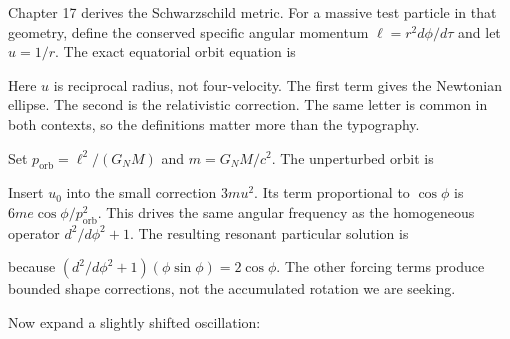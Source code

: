 \documentclass[
  11pt,
  letterpaper,
  oneside,
  openany]{scrbook}
\begin{document}
Chapter 17 derives the Schwarzschild metric. For a massive test particle
in that geometry, define the conserved specific angular momentum
\(\ell=r^2d\phi/d\tau\) and let \(u=1/r\). The exact equatorial orbit
equation is

\begin{center}
\begingroup
{}
\ifdim\wd\grmathbox>\linewidth
\resizebox{\linewidth}{!}{\usebox{\grmathbox}}
\else\usebox{\grmathbox}\fi
\endgroup
\end{center}

Here \(u\) is reciprocal radius, not four-velocity. The first term gives
the Newtonian ellipse. The second is the relativistic correction. The
same letter is common in both contexts, so the definitions matter more
than the typography.

Set \(p_{\mathrm{orb}}=\ell^2/(G_NM)\) and \(m=G_NM/c^2\). The
unperturbed orbit is

\begin{center}
\begingroup
{}
\ifdim\wd\grmathbox>\linewidth
\resizebox{\linewidth}{!}{\usebox{\grmathbox}}
\else\usebox{\grmathbox}\fi
\endgroup
\end{center}

Insert \(u_0\) into the small correction \(3mu^2\). Its term
proportional to \(\cos\phi\) is \(6me\cos\phi/p_{\mathrm{orb}}^2\). This
drives the same angular frequency as the homogeneous operator
\(d^2/d\phi^2+1\). The resulting resonant particular solution is

\begin{center}
\begingroup
{}
\ifdim\wd\grmathbox>\linewidth
\resizebox{\linewidth}{!}{\usebox{\grmathbox}}
\else\usebox{\grmathbox}\fi
\endgroup
\end{center}

because \((d^2/d\phi^2+1)(\phi\sin\phi)=2\cos\phi\). The other forcing
terms produce bounded shape corrections, not the accumulated rotation we
are seeking.

Now expand a slightly shifted oscillation:

\begin{center}
\begingroup
{}
\ifdim\wd\grmathbox>\linewidth
\resizebox{\linewidth}{!}{\usebox{\grmathbox}}
\else\usebox{\grmathbox}\fi
\endgroup
\end{center}
\end{document}

